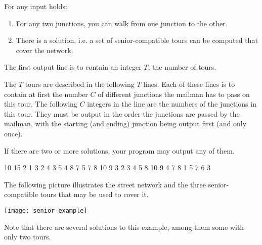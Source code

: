 \documentclass{boi2014}
\begin{document}
    For any input holds:
    \begin{enumerate}
        \item For any two junctions, you can walk from one junction to the other.
        \item There is a solution, i.e. a set of senior-compatible tours can be
        computed that cover the network.
    \end{enumerate}

    \Output
    The first output line is to contain an integer $T$, the number of tours.

    The $T$ tours are described in the following $T$ lines. Each of these lines
    is to contain at first the number $C$ of different junctions the mailman has
    to pass on this tour. The following $C$ integers in the line are the numbers
    of the junctions in this tour. They must be output in the order the
    junctions are passed by the mailman, with the starting (and ending) junction
    being output first (and only once).

    If there are two or more solutions, your program may output any of them.

    \Example

    \example
    {
        10 15  2  1 3  2 4  3 5  4 8  7  5 7  8  10  9
    }
    {
        3  2 3 4 5 8 10 9  4 7 8  1 5 7 6 3
    }
    {
        The following picture illustrates the street network and the three
        senior-compatible tours that may be used to cover it.

        \texttt{[image: senior-example]}

        Note that there are several solutions to this example, among them some
        with only two tours.
    
    }
\end{document}
